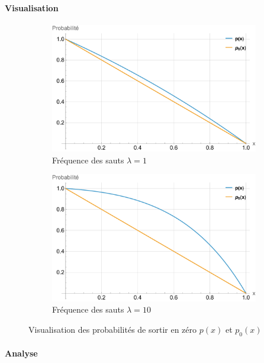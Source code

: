 \paragraph{Visualisation}\phantom{}
\begin{figure}[htb]
    \centering
    \begin{subfigure}{0.45\linewidth}
        \includegraphics[width=\linewidth]{img/validation/Jumps/probability_jumps.pdf}
        \caption{Fréquence des sauts $\lambda=1$}
    \end{subfigure}
    \hfill
    \begin{subfigure}{0.45\linewidth}
        \includegraphics[width=\linewidth]{img/validation/Jumps/probability_big_jumps.pdf}
        \caption{Fréquence des sauts $\lambda=10$}
    \end{subfigure}
    \caption{Visualisation des probabilités de sortir en zéro $p(x)$ et $p_0(x)$}\label{fig:JumpsProbabilityVisualisation}
\end{figure}
\FloatBarrier\paragraph{Analyse}\mbox{}\\
